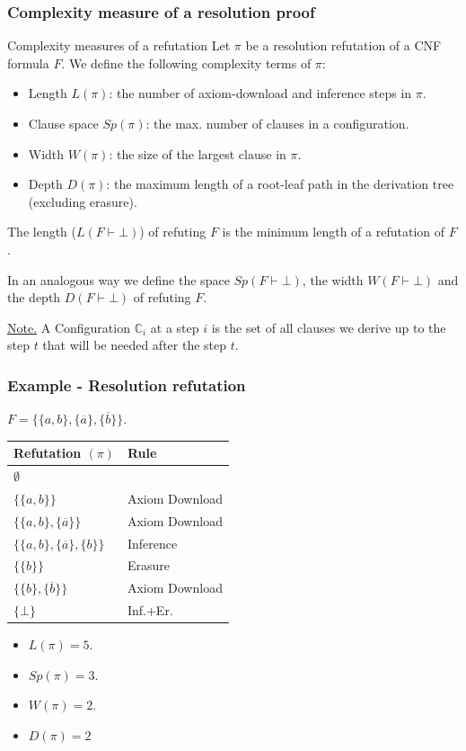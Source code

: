 \documentclass[t,usenames,dvipsnames]{beamer}
\begin{document}
\begin{frame}\frametitle{Complexity measure of a resolution proof}
	\begin{block}{Complexity measures of a refutation}
		Let $\pi$ be a resolution refutation of a CNF formula $F$. We define the
		following complexity terms of $\pi$:
		\begin{itemize}[<+->]
			\item Length $L(\pi)$: the number of axiom-download and
				inference steps in $\pi$.
			\item Clause space $Sp(\pi)$: the max. number of clauses in a
				configuration.
			\item Width $W(\pi)$: the size of the largest clause in $\pi$.
			\item Depth $D(\pi)$: the maximum length of a root-leaf path in the
				derivation tree (excluding erasure).
		\end{itemize}

		\pause%
		The length ($L(F \vdash \bot)$) of refuting $F$ is the minimum length of a
		refutation of $F$.
		
		\pause%
		In an analogous way we define the space $Sp(F \vdash \bot)$, the width $W(F
		\vdash \bot)$ and the depth $D(F \vdash \bot)$ of refuting $F$.
	\end{block}

	\pause
	\noindent \underline{Note.} A Configuration $\mathbb{C}_i$ at a step $i$ is the set of all
	clauses we derive up to the step $t$ that will be needed after the step $t$.
\end{frame}
\begin{frame}\frametitle{Example - Resolution refutation}
	$F = \{ \{a, b\}, \{\overline a\}, \{\overline b\}\}.$ \pause
	\begin{center}
	\begin{tabular}{p{}|p{}}
		Refutation  $(\pi)$ & Rule\\ 
		\midrule
		$\emptyset$ &\\
		$\{\{a, b\}\}$ & Axiom Download\\
		$\{\{a, b\}, \{\overline a\}\}$ & Axiom Download\\
		$\{\{a, b\}, \{\overline a\}, \{b\}\}$ & Inference\\
		$\{\{b\}\}$ & Erasure\\
		$\{\{b\}, \{\overline b\}\}$ & Axiom Download\\
		$\{\bot\}$& Inf.+Er.\\
	  \end{tabular}
	\end{center} \pause
	\begin{itemize}[<+->]
		\item $L(\pi) = 5$.
		\item $Sp(\pi) = 3$.
		\item $W(\pi) = 2$.
		\item $D(\pi) = 2$
	\end{itemize}
\end{frame}
\end{document}
